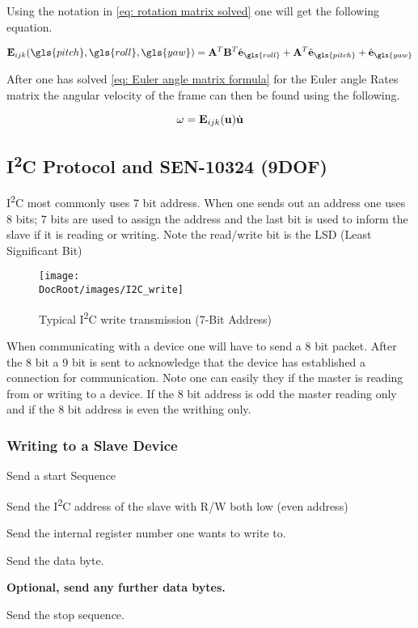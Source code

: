 Using the notation in \eqref{eq: rotation matrix solved} one will get the following equation. 

\begin{equation}
	{\bf E}_{ijk}(\gls{pitch},\gls{roll},\gls{yaw}) = {\bf A}^T{\bf B}^T\hat{\bf e}_{\gls{roll}} +  {\bf A}^T\hat{\bf e}_{\gls{pitch}} + \hat{\bf e}_{\gls{yaw}} 
	\label{eq: Euler angle matrix formula}
\end{equation}

After one has solved \eqref{eq: Euler angle matrix formula} for the Euler angle Rates matrix the angular velocity of the frame can then be found using the following.

\begin{equation}
	\omega = {\bf E}_{ijk}({\bf u}) \dot{\bf u}
	\label{eq: Angular velocity of the frame}
\end{equation}

\tocless\subsection{I\textsuperscript{2}C Protocol and SEN-10324 (9DOF)}

I\textsuperscript{2}C most commonly uses 7 bit address. When one sends out an address one uses 8 bits; 7 bits are used to assign the address and the last bit is used to inform the slave if it is reading or writing. Note the read/write bit is the LSD (Least Significant Bit)

\begin{figure}[h]
	\centering
	\texttt{[image: \\DocRoot/images/I2C\_write]}
	\caption{Typical I\textsuperscript{2}C write transmission (7-Bit Address)}
	
	\label{fig: I2C_write}
\end{figure}

When communicating with a device one will have to send a 8 bit packet. After the 8 bit a 9 bit is sent to acknowledge that the device has established a connection for communication. Note one can easily they if the master is reading from or writing to a device. If the 8 bit address is odd the master reading only and if the 8 bit address is even the writhing only.

\tocless\subsubsection{Writing to a Slave Device}
\begin{enumerate*}
	\item Send a start Sequence
	\item Send the I\textsuperscript{2}C address of the slave with R/W both low (even address)
	\item Send the internal register number one wants to write to.
	\item Send the data byte.
	\item{\bf Optional, send any further data bytes. }
	\item Send the stop sequence.
\end{enumerate*}


